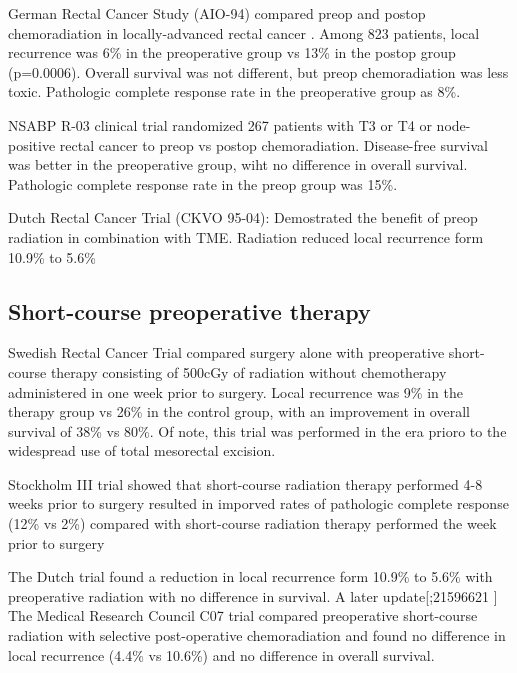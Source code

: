 \documentclass[
]{book}
\begin{document}
German Rectal Cancer Study (AIO-94) compared preop and postop chemoradiation in locally-advanced rectal cancer \citep{sauer173}. Among 823 patients, local recurrence was 6\% in the preoperative group vs 13\% in the postop group (p=0.0006). Overall survival was not different, but preop chemoradiation was less toxic. Pathologic complete response rate in the preoperative group as 8\%.

NSABP R-03 clinical trial \citep{roh5124} randomized 267 patients with T3 or T4 or node-positive rectal cancer to preop vs postop chemoradiation. Disease-free survival was better in the preoperative group, wiht no difference in overall survival. Pathologic complete response rate in the preop group was 15\%.

Dutch Rectal Cancer Trial (CKVO 95-04): Demostrated the benefit of preop radiation in combination with TME\citep{kapiteijn638}. Radiation reduced local recurrence form 10.9\% to 5.6\%

\hypertarget{short-course-preoperative-therapy}{%
\subsection{Short-course preoperative therapy}\label{short-course-preoperative-therapy}}

Swedish Rectal Cancer Trial compared surgery alone with preoperative short-course therapy consisting of 500cGy of radiation without chemotherapy administered in one week prior to surgery. Local recurrence was 9\% in the therapy group vs 26\% in the control group, with an improvement in overall survival of 38\% vs 80\%\citep{swedishrectalcancertrial980}. Of note, this trial was performed in the era prioro to the widespread use of total mesorectal excision.

Stockholm III trial showed that short-course radiation therapy performed 4-8 weeks prior to surgery resulted in imporved rates of pathologic complete response (12\% vs 2\%) compared with short-course radiation therapy performed the week prior to surgery \citep{pettersson972}

The Dutch trial found a reduction in local recurrence form 10.9\% to 5.6\% with preoperative radiation with no difference in survival\citep{kapiteijn638}. A later update{[}\citet{575};21596621 {]} The Medical Research Council C07 trial compared preoperative short-course radiation with selective post-operative chemoradiation and found no difference in local recurrence (4.4\% vs 10.6\%) and no difference in overall survival.\citep{sebag-montefiore811}
\end{document}
